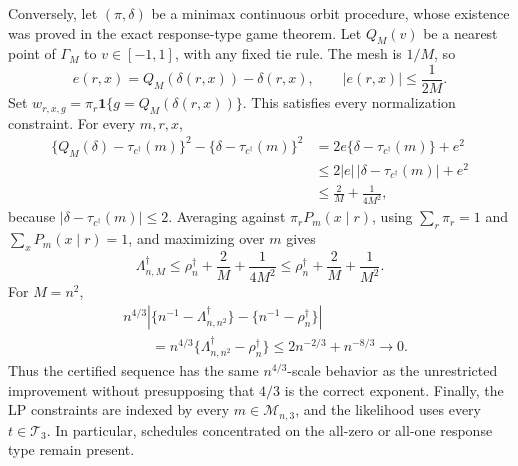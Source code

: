 Conversely, let \((\pi,\delta)\) be a minimax continuous orbit procedure, whose existence was proved in the exact response-type game theorem.  Let \(Q_M(v)\) be a nearest point of \(\Gamma_M\) to \(v\in[-1,1]\), with any fixed tie rule.  The mesh is \(1/M\), so
\[
 e(r,x)=Q_M(\delta(r,x))-\delta(r,x),
 \qquad |e(r,x)|\le\frac1{2M}.
\]
Set
\(w_{r,x,g}=\pi_r\mathbf 1\{g=Q_M(\delta(r,x))\}\).  This satisfies every normalization constraint.  For every \(m,r,x\),
\[
 \begin{aligned}
 \{Q_M(\delta)-\tau_{c^\dagger}(m)\}^2
 -\{\delta-\tau_{c^\dagger}(m)\}^2
 &=2e\{\delta-\tau_{c^\dagger}(m)\}+e^2\\
 &\le2|e|\,|\delta-\tau_{c^\dagger}(m)|+e^2\\
 &\le\frac2M+\frac1{4M^2},
 \end{aligned}
\]
because \(|\delta-\tau_{c^\dagger}(m)|\le2\).  Averaging against \(\pi_rP_m(x\mid r)\), using \(\sum_r\pi_r=1\) and \(\sum_xP_m(x\mid r)=1\), and maximizing over \(m\) gives
\[
 \Lambda_{n,M}^\dagger
 \le\rho_n^\dagger+\frac2M+\frac1{4M^2}
 \le\rho_n^\dagger+\frac2M+\frac1{M^2}.
\]
For \(M=n^2\),
\[
 \begin{aligned}
 &n^{4/3}\left|\{n^{-1}-\Lambda_{n,n^2}^\dagger\}
 -\{n^{-1}-\rho_n^\dagger\}\right|\\
 &\qquad=n^{4/3}\{\Lambda_{n,n^2}^\dagger-\rho_n^\dagger\}
 \le2n^{-2/3}+n^{-8/3}\longrightarrow0.
 \end{aligned}
\]
Thus the certified sequence has the same \(n^{4/3}\)-scale behavior as the unrestricted improvement without presupposing that \(4/3\) is the correct exponent.  Finally, the LP constraints are indexed by every \(m\in\mathcal M_{n,3}\), and the likelihood uses every \(t\in\mathcal T_3\).  In particular, schedules concentrated on the all-zero or all-one response type remain present.